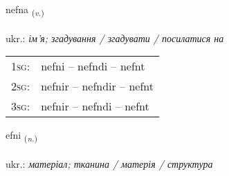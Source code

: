 \documentclass[frontgrid, backgrid]{flacards}\usepackage[]{graphicx}\usepackage[]{xcolor}
\begin{document}
\renewcommand{\flhead}{\vskip5pt \fboxsep=0pt {\small\bfseries\footnotesize Sagnorð | дієслово}}
\renewcommand{\fcfoot}{\vskip5pt \fboxsep=0pt \hspace{2pt}{\small\bfseries\footnotesize 1K}}

\renewcommand{\blhead}{\vskip5pt {\small\bfseries\footnotesize Sagnorð | дієслово }}
\renewcommand{\bcfoot}{\vskip5pt \hspace{2pt}{\small\bfseries\footnotesize 1K}}


{nefna \small{\textsubscript{(\textit{v.})}} \\[1ex] %
\textphonetic{[nɛpna]} \\
ukr.: \emph{ім'я; згадування / згадувати / посилатися на} \\  [2ex]
\renewcommand*{\arraystretch}{0.8}
\begin{tabular}{p{1cm}l}
\textsc{1sg}: & nefni -- nefndi -- nefnt \\ 
\textsc{2sg}: & nefnir -- nefndir -- nefnt \\ 
\textsc{3sg}: & nefnir -- nefndi -- nefnt \\ 
\end{tabular}
}

\renewcommand{\flhead}{\vskip5pt \fboxsep=0pt {\small\bfseries\footnotesize Nafnorð | іменник}}
\renewcommand{\fcfoot}{\vskip5pt \fboxsep=0pt \hspace{2pt}{\small\bfseries\footnotesize 1K}}

\renewcommand{\blhead}{\vskip5pt {\small\bfseries\footnotesize Nafnorð | іменник }}
\renewcommand{\bcfoot}{\vskip5pt \hspace{2pt}{\small\bfseries\footnotesize 1K}}


{efni \small{\textsubscript{(\textit{n.})}} \\[1ex] %
\textphonetic{[ɛpnɪ]} \\
ukr.: \emph{матеріал; тканина / матерія / структура} \\  [2ex]
\renewcommand*{\arraystretch}{0.8}
}
\end{document}
